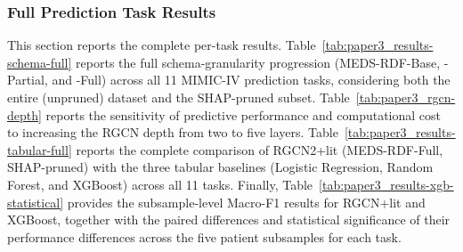 \subsubsection{Full Prediction Task Results}
\label{sec:paper3_supp-results}

This section reports the complete per-task results. Table~\ref{tab:paper3_results-schema-full} reports the full schema-granularity progression (MEDS-RDF-Base, -Partial, and -Full) across all 11 MIMIC-IV prediction tasks, considering both the entire (unpruned) dataset and the SHAP-pruned subset. Table~\ref{tab:paper3_rgcn-depth} reports the sensitivity of predictive performance and computational cost to increasing the RGCN depth from two to five layers. Table~\ref{tab:paper3_results-tabular-full} reports the complete comparison of RGCN2+lit (MEDS-RDF-Full, SHAP-pruned) with the three tabular baselines (Logistic Regression, Random Forest, and XGBoost) across all 11 tasks. Finally, Table~\ref{tab:paper3_results-xgb-statistical} provides the subsample-level Macro-F1 results for RGCN+lit and XGBoost, together with the paired differences and statistical significance of their performance differences across the five patient subsamples for each task.

